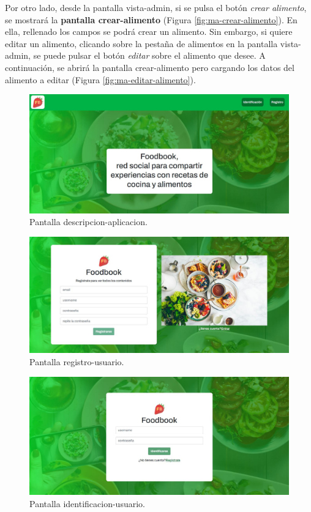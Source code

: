 Por otro lado, desde la pantalla vista-admin, si se pulsa el botón \textit{crear alimento}, se mostrará la \textbf{pantalla crear-alimento} (Figura \ref{fig:ma-crear-alimento}). En ella, rellenado los campos se podrá crear un alimento. Sin embargo, si quiere editar un alimento, clicando sobre la pestaña de alimentos en la pantalla vista-admin, se puede pulsar el botón \textit{editar} sobre el alimento que desee. A continuación, se abrirá la pantalla crear-alimento pero cargando los datos del alimento a editar (Figura \ref{fig:ma-editar-alimento}).


\begin{figure}[H]
  \centering
  \includegraphics[scale=0.30]{img/ma-descripcion-aplicacion.JPG}
  \caption{Pantalla descripcion-aplicacion.}
  \label{fig:ma-descripcion-aplicacion}
\end{figure}

\begin{figure}
  \centering
  \includegraphics[scale=0.30]{img/ma-registro.JPG}
  \caption{Pantalla registro-usuario.}
  \label{fig:ma-registro}
\end{figure}

\begin{figure}
  \centering
  \includegraphics[scale=0.30]{img/ma-identificacion.JPG}
  \caption{Pantalla identificacion-usuario.}
  \label{fig:ma-identificacion}
\end{figure}





